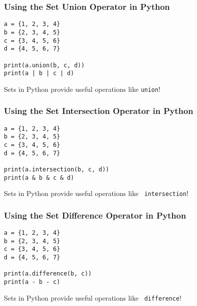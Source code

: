 \documentclass[14pt,aspectratio=169]{beamer}
\begin{document}
%
\begin{frame}[fragile]
  \frametitle{Using the Set Union Operator in Python}
  \normalsize
  \begin{minipage}{6in}
    \vspace*{.25in}
    \begin{verbatim}
a = {1, 2, 3, 4}
b = {2, 3, 4, 5}
c = {3, 4, 5, 6}
d = {4, 5, 6, 7}

print(a.union(b, c, d))
print(a | b | c | d)
    \end{verbatim}
  \end{minipage}
  \vspace*{.05in}
  \begin{center}
    \normalsize \noindent Sets in Python provide useful operations like {\tt union}! \\
  \end{center}
\end{frame}

%
\begin{frame}[fragile]
  \frametitle{Using the Set Intersection Operator in Python}
  \normalsize
  \begin{minipage}{6in}
    \vspace*{.25in}
    \begin{verbatim}
a = {1, 2, 3, 4}
b = {2, 3, 4, 5}
c = {3, 4, 5, 6}
d = {4, 5, 6, 7}

print(a.intersection(b, c, d))
print(a & b & c & d)
    \end{verbatim}
  \end{minipage}
  \vspace*{.05in}
  \begin{center}
    \normalsize \noindent Sets in Python provide useful operations like {\tt
    intersection}! \\
  \end{center}
\end{frame}

%
\begin{frame}[fragile]
  \frametitle{Using the Set Difference Operator in Python}
  \normalsize
  \begin{minipage}{6in}
    \vspace*{.25in}
    \begin{verbatim}
a = {1, 2, 3, 4}
b = {2, 3, 4, 5}
c = {3, 4, 5, 6}
d = {4, 5, 6, 7}

print(a.difference(b, c))
print(a - b - c)
    \end{verbatim}
  \end{minipage}
  \vspace*{.05in}
  \begin{center}
    \normalsize \noindent Sets in Python provide useful operations like {\tt
    difference}! \\
  \end{center}
\end{frame}
\end{document}
